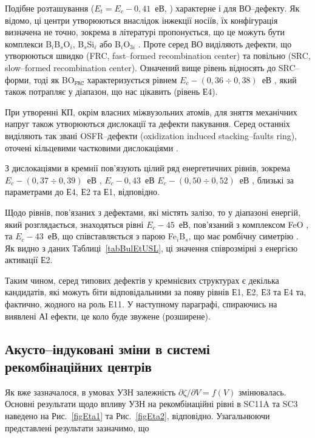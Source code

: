 Подібне розташування ($E_t=E_c-0,41$~еВ, \cite{LIDRev,LIDRev2,BO3i,Rein,LID:SchmidtJMR}) характерне і для ВО--дефекту.
Як відомо, ці центри утворюються внаслідок інжекції носіїв,
їх конфігурація визначена не точно, зокрема в літературі пропонується,
що це можуть бути комплекси B$_i$B$_s$O$_i$, B$_s$Si$_i$\cite{LIDRev} або
B$_i$O$_{3i}$ \cite{BO3i}.
Проте серед ВО виділяють дефекти,
що утворюються швидко (FRC, fast--formed recombination center)
та повільно (SRC, slow--formed recombination center).
Означений вище рівень відносять до SRC--форми,
тоді як  BO$_\mathtt{FRC}$ характеризується рівнем $E_c-(0,36\div0,38)$~еВ \cite{LIDRev2,BOSingle:SEMSS2017}, який
також потрапляє у діапазон, що нас цікавить (рівень Е4).

При утворенні КП, окрім власних міжвузольних атомів, для зняття механічних напруг також утворюються дислокації та дефекти пакування.
Серед останніх виділяють так звані OSFR--дефекти (oxidization induced stacking--faults ring), оточені кільцевими частковими дислокаціями \cite{MSER74,MSER28}.

З дислокаціями в кремнії пов'язують цілий ряд енергетичних рівнів, зокрема
$E_c-(0,37\div0,39)$~еВ \cite{PhysRevB56:10208,kveder2008,SiO:Hwang,disl10:Isakova,Kittler2003},
$E_c-0,43$~еВ \cite{PhysRevB56:10208,SiO:Vanhell}
$E_c-(0,50\div0,52)$~еВ \cite{Edis:Ogawa,Edis:Omling,Kittler2003},
близькі за параметрами до Е4, Е2 та Е1, відповідно.

Щодо рівнів, пов'язаних з дефектами, які містять залізо, то у діапазоні енергій, який розглядається,
знаходяться рівні $E_c-45$~еВ, пов'язаний з комплексом FeO \cite{FeO},
та $E_c-43$~еВ, що співставляється з парою Fe$_i$B$_s$, що має ромбічну симетрію \cite{FeB:PhysRevB49,Istratov1999}.
Як видно з даних Таблиці~\ref{tabBulEtUSL}, ці значення співрозмірні з енергією активації Е2.

Таким чином, серед типових дефектів у кремнієвих структурах є декілька кандидатів,
які можуть біти відповідальними за появу рівнів Е1, Е2, Е3 та Е4 та, фактично, жодного на роль Е11.
У наступному параграфі, спираючись на виявлені АІ ефекти, це коло буде звужене (розширене).

\subsection{Акусто--індуковані зміни в системі рекомбінаційних центрів\label{sbBul3}}

Як вже зазначалося, в умовах УЗН залежність $\partial \zeta/ \partial V = f (V)$ змінювалась.
Основні результати щодо впливу УЗН на рекомбінаційні рівні в SC11A та SC3 наведено
на Рис.~\ref{figEta1} та Рис.~\ref{figEta2}, відповідно.
Узагальнюючи представлені результати зазначимо, що


